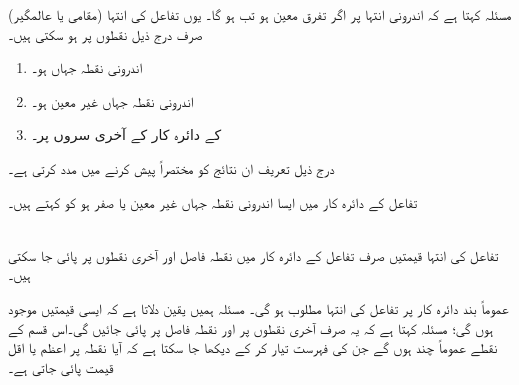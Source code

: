 مسئلہ  کہتا ہے کہ اندرونی انتہا پر اگر تفرق معین ہو تب  ہو گا۔ یوں تفاعل کی انتہا (مقامی یا عالمگیر) صرف درج ذیل نقطوں پر ہو سکتی ہیں۔
\begin{enumerate}[1.]
\item
اندرونی نقطہ جہاں  ہو۔\\
\item
اندرونی نقطہ جہاں  غیر معین ہو۔\\
\item
{} کے دائرہ کار کے آخری سروں پر۔
\end{enumerate}

درج ذیل تعریف ان نتائج کو مختصراً پیش کرنے میں مدد کرتی ہے۔

تفاعل  کے دائرہ کار میں ایسا اندرونی نقطہ جہاں  غیر معین یا صفر ہو کو  کہتے ہیں۔ 

\\
تفاعل کی انتہا قیمتیں صرف تفاعل کے دائرہ کار میں نقطہ فاصل اور آخری نقطوں  پر پائی جا سکتی ہیں۔ 

عموماً بند دائرہ کار پر تفاعل  کی انتہا  مطلوب ہو گی۔ مسئلہ  ہمیں یقین دلاتا ہے کہ ایسی قیمتیں موجود ہوں گی؛  مسئلہ  کہتا ہے کہ یہ صرف آخری نقطوں پر اور نقطہ فاصل پر پائی جائیں گی۔اس قسم کے نقطے عموماً چند ہوں گے جن کی فہرست تیار کر کے دیکھا جا سکتا ہے کہ آیا نقطہ پر اعظم یا اقل قیمت پائی جاتی ہے۔

